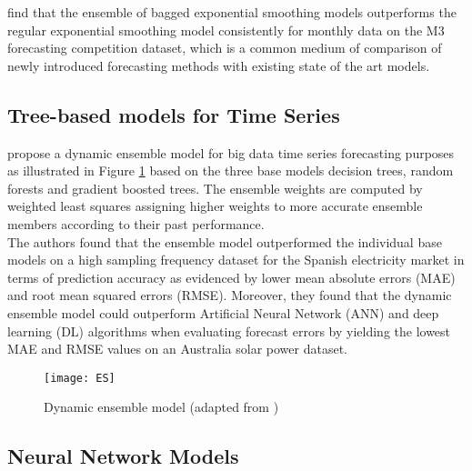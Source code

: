 \textcite{bergmeir} find that the ensemble of bagged exponential smoothing models outperforms the regular exponential smoothing model consistently for monthly data on the M3 forecasting competition dataset, which is a common medium of comparison of newly introduced forecasting methods with existing state of the art models.


\subsection{Tree-based models for Time Series}

\textcite{galicia2019} propose a dynamic ensemble model for big data time series forecasting purposes as illustrated in Figure \ref{fig: Dynamic ensemble model} based on the three base models decision trees, random forests and gradient boosted trees. The ensemble weights are computed by weighted least squares assigning higher weights to more accurate ensemble members according to their past performance.\\

 
\noindent The authors found that the ensemble model outperformed the individual base models on a high sampling frequency dataset for the Spanish electricity market in terms of prediction accuracy as evidenced by lower mean absolute errors (MAE) and root mean squared errors (RMSE). Moreover, they found that the dynamic ensemble model could outperform Artificial Neural Network (ANN) and deep learning (DL) algorithms when evaluating forecast errors by yielding the lowest MAE and RMSE values on an Australia solar power dataset.

\begin{figure} [h]
\centering
\texttt{[image: ES]}
\caption{Dynamic ensemble model (adapted from \textcite{galicia2019})}
\label{fig: Dynamic ensemble model}
\end{figure}

\subsection{Neural Network Models}